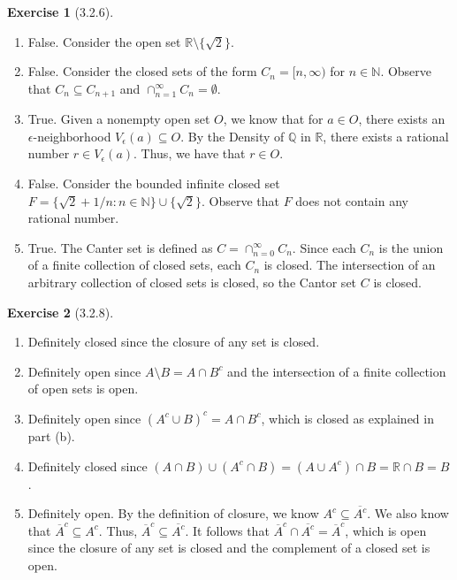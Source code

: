 \documentclass{amsart}
\theoremstyle{definition}
\newtheorem{exercise}{Exercise}
\newcommand{\N}{\mathbb{N}}
\newcommand{\Q}{\mathbb{Q}}
\newcommand{\R}{\mathbb{R}}
\newcommand{\st}{\mathrel{:}}
\begin{document}
\begin{exercise}[3.2.6]
  \begin{enumerate}[label={(\alph*)}]
    \item False. Consider the open set $\R \setminus \{\sqrt{2}\}$.
    \item False. Consider the closed sets of the form $C_n = \lbrack n, \infty
      \rparen$ for $n \in \N$. Observe that $C_n \subseteq C_{n+1}$ and
      $\cap_{n=1}^\infty C_n = \emptyset$.
    \item True. Given a nonempty open set $O$, we know that for $a \in O$, there
      exists an $\epsilon$-neighborhood $V_\epsilon(a) \subseteq O$. By the
      Density of $\Q$ in $\R$, there exists a rational number $r \in
      V_\epsilon(a)$. Thus, we have that $r \in O$.
    \item False. Consider the bounded infinite closed set $F = \{\sqrt{2} + 1/n
      \st n \in \N\} \cup \{\sqrt{2}\}$. Observe that $F$ does not contain any
      rational number.
    \item True. The Canter set is defined as $C = \cap_{n=0}^\infty C_n$. Since
      each $C_n$ is the union of a finite collection of closed sets, each $C_n$
      is closed. The intersection of an arbitrary collection of closed sets is
      closed, so the Cantor set $C$ is closed.
  \end{enumerate}
\end{exercise}

\begin{exercise}[3.2.8]
  \begin{enumerate}[label={(\alph*)}]
    \item Definitely closed since the closure of any set is closed.
    \item Definitely open since $A \setminus B = A \cap B^c$ and the
      intersection of a finite collection of open sets is open.
    \item Definitely open since ${(A^c \cup B)}^c = A \cap B^c$, which is closed
      as explained in part (b).
    \item Definitely closed since  $(A \cap B) \cup (A^c \cap B) = (A \cup A^c)
      \cap B = \R \cap B = B$.
    \item Definitely open. By the definition of closure, we know $A^c \subseteq
      \overline{A^c}$. We also know that $\overline{A}^c \subseteq A^c$. Thus,
      $\overline{A}^c \subseteq \overline{A^c}$. It follows that $\overline{A}^c
      \cap \overline{A^c} = \overline{A}^c$, which is open since the closure of
      any set is closed and the complement of a closed set is open.
  \end{enumerate}
\end{exercise}
\end{document}
